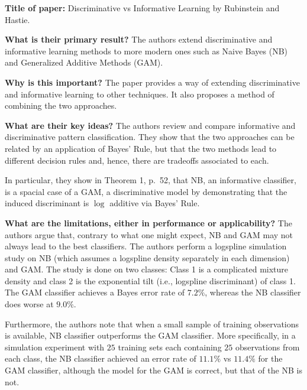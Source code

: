 \noindent \textbf{Title of paper: } Discriminative vs Informative Learning by
Rubinstein and Hastie. 

\noindent\textbf{What is their primary result?} The authors extend
discriminative and informative learning methods to more modern ones such as
Naive Bayes (NB) and Generalized Additive Methods (GAM). 

\noindent\textbf{Why is this important?} The paper provides a way of extending
discriminative and informative learning to other techniques. It also proposes a
method of combining the two approaches.

\noindent\textbf{What are their key ideas?} The authors review and compare
informative and discriminative pattern classification. They show that the two
approaches can be related by an application of Bayes' Rule, but that the two
methods lead to different decision rules and, hence, there are tradeoffs
associated to each.

In particular, they show in Theorem 1, p.\ 52, that NB, an informative
classifier, is a spacial case of a GAM, a discriminative model by demonstrating
that the induced discriminant is $\log$ additive via Bayes' Rule.



\noindent\textbf{What are the limitations, either in performance or
  applicability?}
The authors argue that, contrary to what one might expect, NB and GAM may not
always lead to the best classifiers. The authors perform a logspline simulation
study on NB (which assumes a logspline density separately in each dimension) and
GAM. The study is done on two classes: Class 1 is a complicated mixture density
and class 2 is the exponential tilt (i.e., logspline discriminant) of class 1.
The GAM classifier achieves a Bayes error rate of $7.2\%$, whereas the NB
classifier does worse at $9.0\%$.

Furthermore, the authors note that when a small sample of training observations
is available, NB classifier outperforms the GAM classifier. More specifically,
in a simulation experiment with $25$ training sets each containing $25$
observations from each class, the NB classifier achieved an error rate of
$11.1\%$ vs $11.4\%$ for the GAM classifier, although the model for the GAM is
correct, but that of the NB is not.





